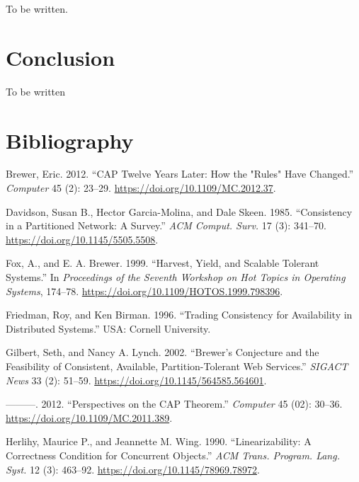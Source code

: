 \documentclass[]             %
{NASA}                       %
\newlength{\cslhangindent}
\newlength{\cslentryspacingunit} %
\newenvironment{CSLReferences}[2] %
 {%
  \setlength{\parindent}{0pt}
  \ifodd #1
  \let\oldpar\par
  \def\par{\hangindent=\cslhangindent\oldpar}
  \fi
  \setlength{\parskip}{#2\cslentryspacingunit}
 }%
 {}
\theoremstyle{definition}
\begin{document}
To be written.

\hypertarget{conclusion}{%
\section{Conclusion}\label{conclusion}}

\label{sec:conclusion}

To be written

\hypertarget{bibliography}{%
\section*{Bibliography}\label{bibliography}}

\hypertarget{refs}{}
\begin{CSLReferences}{1}{0}
\leavevmode{}%
Brewer, Eric. 2012. {``CAP Twelve Years Later: How the "Rules" Have
Changed.''} \emph{Computer} 45 (2): 23--29.
\url{https://doi.org/10.1109/MC.2012.37}.

\leavevmode{}%
Davidson, Susan B., Hector Garcia-Molina, and Dale Skeen. 1985.
{``Consistency in a Partitioned Network: A Survey.''} \emph{ACM Comput.
Surv.} 17 (3): 341--70. \url{https://doi.org/10.1145/5505.5508}.

\leavevmode{}%
Fox, A., and E. A. Brewer. 1999. {``Harvest, Yield, and Scalable
Tolerant Systems.''} In \emph{Proceedings of the Seventh Workshop on Hot
Topics in Operating Systems}, 174--78.
\url{https://doi.org/10.1109/HOTOS.1999.798396}.

\leavevmode{}%
Friedman, Roy, and Ken Birman. 1996. {``Trading Consistency for
Availability in Distributed Systems.''} USA: Cornell University.

\leavevmode{}%
Gilbert, Seth, and Nancy A. Lynch. 2002. {``Brewer's Conjecture and the
Feasibility of Consistent, Available, Partition-Tolerant Web
Services.''} \emph{SIGACT News} 33 (2): 51--59.
\url{https://doi.org/10.1145/564585.564601}.

\leavevmode{}%
---------. 2012. {``Perspectives on the CAP Theorem.''} \emph{Computer}
45 (02): 30--36. \url{https://doi.org/10.1109/MC.2011.389}.

\leavevmode{}%
Herlihy, Maurice P., and Jeannette M. Wing. 1990. {``Linearizability: A
Correctness Condition for Concurrent Objects.''} \emph{ACM Trans.
Program. Lang. Syst.} 12 (3): 463--92.
\url{https://doi.org/10.1145/78969.78972}.


\end{CSLReferences}
\end{document}

